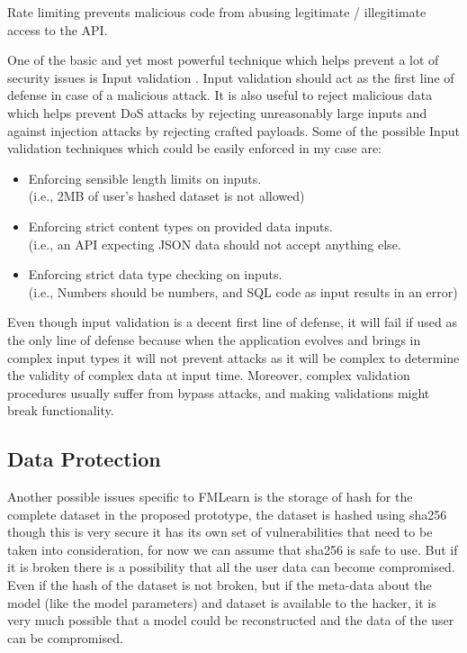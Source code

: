Rate limiting prevents malicious code from abusing legitimate / illegitimate access to the API.

One of the basic and yet most powerful technique which helps prevent a lot of security issues is Input validation \citep{web-application-sec}. Input validation should act as the first line of defense in case of a malicious attack. It is also useful to reject malicious data which helps prevent DoS attacks by rejecting unreasonably large inputs and against injection attacks by rejecting crafted payloads. Some of the possible Input validation techniques which could be easily enforced in my case are:

\begin{itemize}
    \item Enforcing sensible length limits on inputs.\\
    (i.e., 2MB of user’s hashed dataset is not allowed)
    \item Enforcing strict content types on provided data inputs.\\
    (i.e., an API expecting JSON data should not accept anything else.
    \item Enforcing strict data type checking on inputs.\\
    (i.e., Numbers should be numbers, and SQL code as input results in an error)
\end{itemize}

Even though input validation is a decent first line of defense, it will fail if used as the only line of defense because when the application evolves and brings in complex input types it will not prevent attacks as it will be complex to determine the validity of complex data at input time. Moreover, complex validation procedures usually suffer from bypass attacks, and making validations might break functionality. \citep{philippe_2020}

\subsection{Data Protection}
Another possible issues specific to FMLearn is the storage of hash for the complete dataset in the proposed prototype, the dataset is hashed using sha256 though this is very secure it has its own set of vulnerabilities \citep{sha256} that need to be taken into consideration, for now we can assume that sha256 is safe to use. But if it is broken there is a possibility that all the user data can become compromised. Even if the hash of the dataset is not broken, but if the meta-data about the model (like the model parameters) and dataset is available to the hacker, it is very much possible that a model could be reconstructed and the data of the user can be compromised.

